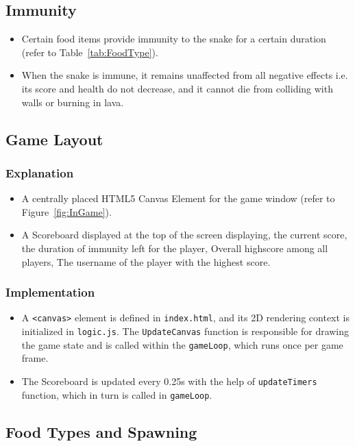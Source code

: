 \documentclass{article}
\begin{document}
    \subsection{Immunity}
    \begin{itemize}
        \item Certain food items provide immunity to the snake for a certain duration (refer to Table~\ref{tab:FoodType}).
        \item When the snake is immune, it remains unaffected from all negative effects i.e. its score and health do not decrease, and it cannot die from colliding with walls or burning in lava.
    \end{itemize}
    \subsection{Game Layout}
    
    \subsubsection{Explanation}
    \begin{itemize}
        \item A centrally placed HTML5 Canvas Element for the game window (refer to Figure~\ref{fig:InGame}).
        \item A Scoreboard displayed at the top of the screen displaying, the current score,
        the duration of immunity left for the player, Overall highscore among all players, The username of the player with the highest score.
    \end{itemize}
    \subsubsection{Implementation}
    \begin{itemize}
        \item A \texttt{<canvas>} element is defined in \texttt{index.html}, and its 2D rendering context is initialized in \texttt{logic.js}. The \texttt{UpdateCanvas} function is responsible for drawing the game state and is called within the \texttt{gameLoop}, which runs once per game frame.
        \item The Scoreboard is updated every 0.25s with the help of \texttt{updateTimers} function, which in turn is called in \texttt{gameLoop}.
    \end{itemize}
    
    \subsection{Food Types and Spawning} 
\end{document}
